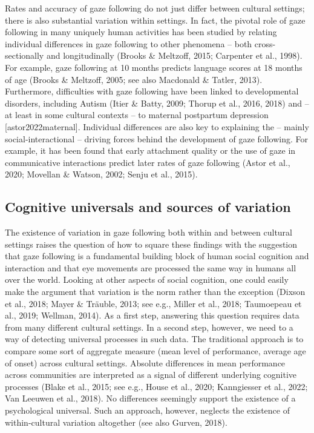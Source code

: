 \documentclass[
  man,floatsintext]{apa7}
\begin{document}
Rates and accuracy of gaze following do not just differ between cultural settings; there is also substantial variation within settings. In fact, the pivotal role of gaze following in many uniquely human activities has been studied by relating individual differences in gaze following to other phenomena -- both cross-sectionally and longitudinally (Brooks \& Meltzoff, 2015; Carpenter et al., 1998). For example, gaze following at 10 months predicts language scores at 18 months of age (Brooks \& Meltzoff, 2005; see also Macdonald \& Tatler, 2013). Furthermore, difficulties with gaze following have been linked to developmental disorders, including Autism (Itier \& Batty, 2009; Thorup et al., 2016, 2018) and -- at least in some cultural contexts -- to maternal postpartum depression {[}astor2022maternal{]}. Individual differences are also key to explaining the -- mainly social-interactional -- driving forces behind the development of gaze following. For example, it has been found that early attachment quality or the use of gaze in communicative interactions predict later rates of gaze following (Astor et al., 2020; Movellan \& Watson, 2002; Senju et al., 2015).

\hypertarget{cognitive-universals-and-sources-of-variation}{%
\subsection{Cognitive universals and sources of variation}\label{cognitive-universals-and-sources-of-variation}}

The existence of variation in gaze following both within and between cultural settings raises the question of how to square these findings with the suggestion that gaze following is a fundamental building block of human social cognition and interaction and that eye movements are processed the same way in humans all over the world. Looking at other aspects of social cognition, one could easily make the argument that variation is the norm rather than the exception (Dixson et al., 2018; Mayer \& Träuble, 2013; see e.g., Miller et al., 2018; Taumoepeau et al., 2019; Wellman, 2014). As a first step, answering this question requires data from many different cultural settings. In a second step, however, we need to a way of detecting universal processes in such data. The traditional approach is to compare some sort of aggregate measure (mean level of performance, average age of onset) across cultural settings. Absolute differences in mean performance across communities are interpreted as a signal of different underlying cognitive processes (Blake et al., 2015; see e.g., House et al., 2020; Kanngiesser et al., 2022; Van Leeuwen et al., 2018). No differences seemingly support the existence of a psychological universal. Such an approach, however, neglects the existence of within-cultural variation altogether (see also Gurven, 2018).
\end{document}
